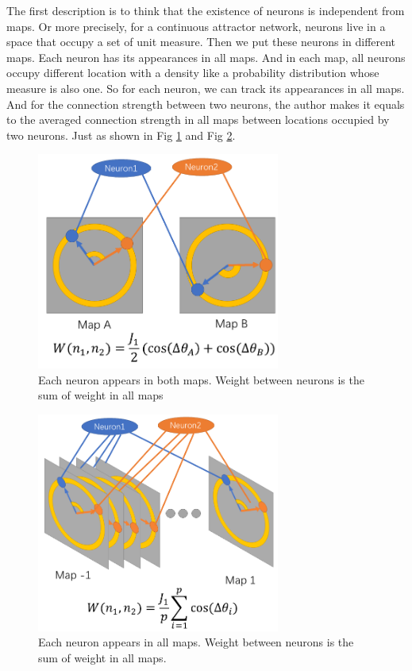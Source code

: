 \documentclass{article}
\begin{document}
	The first description is to think that the existence of neurons is independent from maps. Or more precisely, for a continuous attractor network, neurons live in a space that occupy a set of unit measure. Then we put these neurons in different maps. Each neuron has its appearances in all maps. And in each map, all neurons occupy different location with a density like a probability distribution whose measure is also one. So for each neuron, we can track its appearances in all maps. And for the connection strength between two neurons, the author makes it equals to the averaged connection strength in all maps between locations occupied by two neurons. Just as shown in Fig \ref{fig:morph} and Fig \ref{fig:morph_more}.
	\begin{figure}[h]
	\centering
	\includegraphics[width=8cm]{morph.png}
	\caption{Each neuron appears in both maps. Weight between neurons is the sum of weight in all maps}
	\label{fig:morph}
	\end{figure}

	\begin{figure}[h]
		\centering
		\includegraphics[width=8cm]{morph_more.png}
		\caption{Each neuron appears in all maps. Weight between neurons is the sum of weight in all maps.}
		\label{fig:morph_more}
	\end{figure}
	
\end{document}

